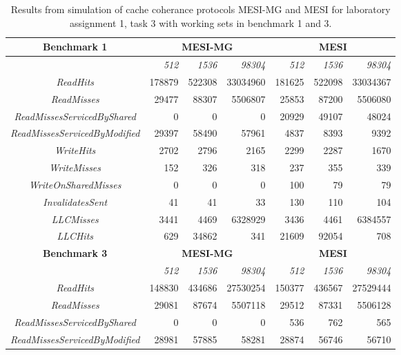 \begin{table}[h]
	\caption{\label{tbl:lab2}Results from simulation of cache coherance protocols MESI-MG and MESI for laboratory assignment 1, task 3 with working sets in benchmark 1 and 3.}
    \begin{adjustwidth}{-2cm}{-2cm}  
        \begin{center}

			\begin{tabular}{| c | r r r | r r r|}
				\textbf{Benchmark 1}& \multicolumn{3}{c|}{\textbf{MESI-MG}} & \multicolumn{3}{c|}{\textbf{MESI}} \\
				\hline
				&\textit{512}&\textit{1536}&\textit{98304}&\textit{512}&\textit{1536}&\textit{98304}\\
				\hline
				\textit{ReadHits} & 178879 & 522308 & 33034960 & 181625 & 522098 & 33034367 \\
				\textit{ReadMisses} & 29477 & 88307 & 5506807 & 25853 & 87200 & 5506080 \\ 
				\textit{ReadMissesServicedByShared} & 0 & 0 & 0 & 20929 & 49107 & 48024 \\ 
				\textit{ReadMissesServicedByModified} & 29397 & 58490 & 57961 & 4837 & 8393 & 9392 \\ 
				\textit{WriteHits} & 2702 & 2796 & 2165 & 2299 & 2287 & 1670 \\
				\textit{WriteMisses} & 152 & 326 & 318 & 237 & 355 & 339 \\
				\textit{WriteOnSharedMisses} & 0 & 0 & 0 & 100 & 79 & 79 \\
				\textit{InvalidatesSent} & 41 & 41 & 33 & 130 & 110 & 104 \\
				\textit{LLCMisses} & 3441 & 4469 & 6328929 & 3436 & 4461 & 6384557 \\
				\textit{LLCHits} & 629 & 34862 & 341 & 21609 & 92054 & 708 \\
				\hline
				\textbf{Benchmark 3}& \multicolumn{3}{c|}{\textbf{MESI-MG}} & \multicolumn{3}{c|}{\textbf{MESI}} \\
				\hline
				&\textit{512}&\textit{1536}&\textit{98304}&\textit{512}&\textit{1536}&\textit{98304}\\
				\hline
				\textit{ReadHits} & 148830 & 434686 & 27530254 & 150377 & 436567 & 27529444 \\
				\textit{ReadMisses} & 29081 & 87674 & 5507118 & 29512 & 87331 & 5506128 \\ 
				\textit{ReadMissesServicedByShared} & 0 & 0 & 0 & 536 & 762 & 565 \\ 
				\textit{ReadMissesServicedByModified} & 28981 & 57885 & 58281 & 28874 & 56746 & 56710 \\ 

\end{tabular}
\end{center}
\end{adjustwidth}
\end{table}
